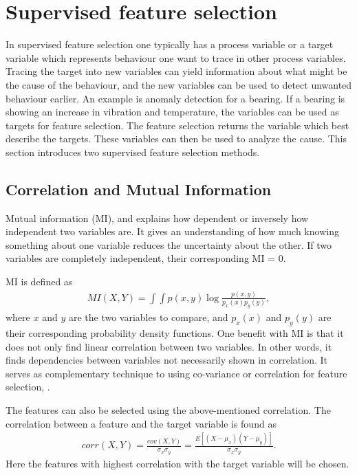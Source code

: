     \section{Supervised feature selection}\label{sec:sup_feat_select}
        In supervised feature selection one typically has a process variable or a target variable which represents behaviour one want to trace in other process variables. Tracing the target into new variables can yield information about what might be the cause of the behaviour, and the new variables can be used to detect unwanted behaviour earlier. An example is anomaly detection for a bearing. If a bearing is showing an increase in vibration and temperature, the variables can be used as targets for feature selection. The feature selection returns the variable which best describe the targets. These variables can then be used to analyze the cause. This section introduces two supervised feature selection methods. 
        
    
    \subsection{Correlation and  Mutual Information}\label{subsec:K-best_feat_select}
    
        Mutual information (MI), \cite{Kraskov2004} and \cite{Peng2005} explains how dependent or inversely how independent two variables are. It gives an understanding of how much knowing something about one variable reduces the uncertainty about the other. If two variables are completely independent, their corresponding MI = 0. 
        
        MI is defined as
        \begin{align}\label{eq:tech_MI}
                MI(X,Y) = \int \int p(x,y) \log \frac{p(x,y)}{p_x(x)p_y(y)},
        \end{align}
        where $x$ and $y$ are the two variables to compare, and $p_x(x)$ and $p_y(y)$ are their corresponding probability density functions. One benefit with MI is that it does not only find linear correlation between two variables. In other words, it finds dependencies between variables not necessarily shown in correlation. It serves as complementary technique to using co-variance or correlation for feature selection, \cite{Li}. 
        
        
        The features can also be selected using the above-mentioned correlation. The correlation between a feature and the target variable is found as  
        \begin{align}
            corr(X,Y) = \frac{cov(X,Y)}{\sigma_x\sigma_y} = \frac{E[(X-\mu_x)(Y-\mu_y)]}{\sigma_x\sigma_y}.
        \end{align}
        Here the features with highest correlation with the target variable will be chosen. 
        
